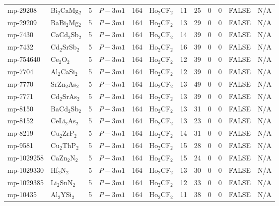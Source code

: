 {\begin{longtable}{llcccccccccc}
    mp-29208 & Bi$_{2}$CaMg$_{2}$ & 5     & $P-3m1$ & 164   & Ho$_{2}$CF$_{2}$ & 11    & 25    & 0     & 0     & FALSE & N/A \\
    mp-29209 & BaBi$_{2}$Mg$_{2}$ & 5     & $P-3m1$ & 164   & Ho$_{2}$CF$_{2}$ & 13    & 29    & 0     & 0     & FALSE & N/A \\
    mp-7430 & CaCd$_{2}$Sb$_{2}$ & 5     & $P-3m1$ & 164   & Ho$_{2}$CF$_{2}$ & 14    & 39    & 0     & 0     & FALSE & N/A \\
    mp-7432 & Cd$_{2}$SrSb$_{2}$ & 5     & $P-3m1$ & 164   & Ho$_{2}$CF$_{2}$ & 16    & 39    & 0     & 0     & FALSE & N/A \\
    mp-754640 & Ce$_{2}$O$_{2}$ & 5     & $P-3m1$ & 164   & Ho$_{2}$CF$_{2}$ & 12    & 39    & 0     & 0     & FALSE & N/A \\
    mp-7704 & Al$_{2}$CaSi$_{2}$ & 5     & $P-3m1$ & 164   & Ho$_{2}$CF$_{2}$ & 12    & 39    & 0     & 0     & FALSE & N/A \\
    mp-7770 & SrZn$_{2}$As$_{2}$ & 5     & $P-3m1$ & 164   & Ho$_{2}$CF$_{2}$ & 13    & 49    & 0     & 0     & FALSE & N/A \\
    mp-7771 & Cd$_{2}$SrAs$_{2}$ & 5     & $P-3m1$ & 164   & Ho$_{2}$CF$_{2}$ & 13    & 39    & 0     & 0     & FALSE & N/A \\
    mp-8150 & BaCd$_{2}$Sb$_{2}$ & 5     & $P-3m1$ & 164   & Ho$_{2}$CF$_{2}$ & 13    & 31    & 0     & 0     & FALSE & N/A \\
    mp-8152 & CeLi$_{2}$As$_{2}$ & 5     & $P-3m1$ & 164   & Ho$_{2}$CF$_{2}$ & 13    & 23    & 0     & 0     & FALSE & N/A \\
    mp-8219 & Cu$_{2}$ZrP$_{2}$ & 5     & $P-3m1$ & 164   & Ho$_{2}$CF$_{2}$ & 14    & 31    & 0     & 0     & FALSE & N/A \\
    mp-9581 & Cu$_{2}$ThP$_{2}$ & 5     & $P-3m1$ & 164   & Ho$_{2}$CF$_{2}$ & 15    & 28    & 0     & 0     & FALSE & N/A \\
    mp-1029258 & CaZn$_{2}$N$_{2}$ & 5     & $P-3m1$ & 164   & Ho$_{2}$CF$_{2}$ & 15    & 24    & 0     & 0     & FALSE & N/A \\
    mp-1029330 & Hf$_{2}$N$_{2}$ & 5     & $P-3m1$ & 164   & Ho$_{2}$CF$_{2}$ & 13    & 30    & 0     & 0     & FALSE & N/A \\
    mp-1029385 & Li$_{2}$SnN$_{2}$ & 5     & $P-3m1$ & 164   & Ho$_{2}$CF$_{2}$ & 12    & 33    & 0     & 0     & FALSE & N/A \\
    mp-10435 & Al$_{2}$YSi$_{2}$ & 5     & $P-3m1$ & 164   & Ho$_{2}$CF$_{2}$ & 11    & 38    & 0     & 0     & FALSE & N/A \\

\end{longtable}}
